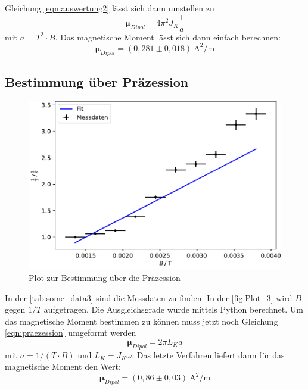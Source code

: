 \documentclass[
  bibliography=totoc,     %
  captions=tableheading,  %
  titlepage=firstiscover, %
]{scrartcl}
\begin{document}
  Gleichung \eqref{eqn:auswertung2} lässt sich dann umstellen zu
  \begin{equation}
    \symbf{\mu}_{Dipol} = 4 \pi^2 J_K \frac{1}{a}
  \end{equation}
  mit $a = T^{2} \cdot B$.
  Das magnetische Moment lässt sich dann einfach berechnen:
  \begin{equation*}
    \symbf{\mu}_{Dipol} = (0,281 \pm 0,018) \: \text{A}^{2}/\text{m}
  \end{equation*}

  \subsection{Bestimmung über Präzession}
  
  \FloatBarrier
  \begin{figure}
    \includegraphics[scale=.6]{plot3.pdf}
    \caption{Plot zur Bestimmung über die Präzession}
    \label{fig:Plot_3}
  \end{figure}
  \FloatBarrier
  In der \autoref{tab:some_data3} sind die Messdaten zu finden. 
  In der \autoref{fig:Plot_3} wird $B$ gegen $1/T$ aufgetragen. Die Ausgleichsgrade wurde mittels Python berechnet. 
  Um das magnetische Moment bestimmen zu können muss jetzt noch Gleichung \eqref{eqn:praezession} umgeformt werden
  \begin{equation}
    \symbf{\mu}_{Dipol} = 2 \pi L_K a
  \end{equation}
  mit $a = 1/(T \cdot B)$ und $L_K = J_K \omega$.
  Das letzte Verfahren liefert dann für das magnetische Moment den Wert:
  \begin{equation*}
    \symbf{\mu}_{Dipol} = (0,86 \pm 0,03) \: \text{A}^{2}/\text{m}
  \end{equation*}
  
\end{document}
